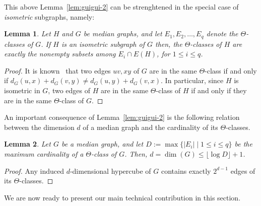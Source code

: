 \documentclass{article}
\newtheorem{lemma}{Lemma}
\begin{document}
This above Lemma~\ref{lem:guigui-2} can be strenghtened in the special case of {\em isometric} subgraphs, namely:

\begin{lemma}\label{lem:guigui-2bis}
Let $H$ and $G$ be median graphs, and let $E_1,E_2,\ldots,E_q$ denote the $\Theta$-classes of $G$.
If $H$ is an isometric subgraph of $G$ then, the $\Theta$-classes of $H$ are exactly the nonempty subsets among $E_i \cap E(H)$, for $1 \leq i \leq q$.
\end{lemma}
\begin{proof}
It is known~\cite{winkler1984isometric} that two edges $uv,xy$ of $G$ are in the same $\Theta$-class if and only if $d_G(u,x) + d_G(v,y) \neq d_G(u,y) + d_G(v,x)$.
In particular, since $H$ is isometric in $G$, two edges of $H$ are in the same $\Theta$-class of $H$ if and only if they are in the same $\Theta$-class of $G$.
\end{proof}

An important consequence of Lemma~\ref{lem:guigui-2} is the following relation between the dimension $d$ of a median graph and the cardinality of its $\Theta$-classes.

\begin{lemma}\label{lem:guigui-3}
Let $G$ be a median graph, and let $D := \max\{ |E_i| \mid 1 \leq i \leq q\}$ be the maximum cardinality of a $\Theta$-class of $G$. Then, $d = \dim(G) \leq \lfloor\log{D}\rfloor + 1$.
\end{lemma}
\begin{proof}
Any induced $d$-dimensional hypercube of $G$ contains exactly $2^{d-1}$ edges of its $\Theta$-classes.
\end{proof}

We are now ready to present our main technical contribution in this section.
\end{document}
